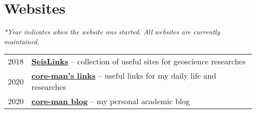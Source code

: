 \section*{Websites}

\textit{*Year indicates when the website was started. All websites are currently maintained.}

\begin{tabular}{p{} p{}}
2018 &	\textbf{\href{https://link.seisman.info/}{SeisLinks}} -- collection of useful sites for geoscience researches \\
2020 &	\textbf{\href{https://core-man.github.io/link/}{core-man's links}} -- useful links for my daily life and researches \\
2020 &	\textbf{\href{https://core-man.github.io/blog/}{core-man blog}} -- my personal academic blog \\
\end{tabular}
